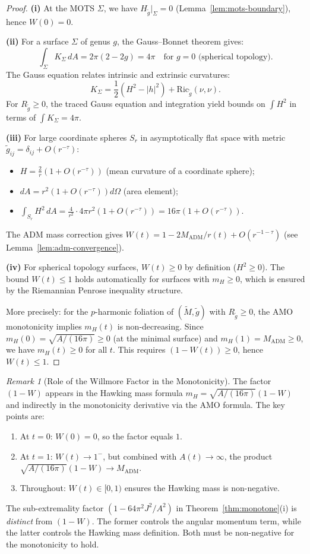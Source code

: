 \documentclass[12pt]{article}
\theoremstyle{plain}
\theoremstyle{definition}
\theoremstyle{remark}
\newtheorem{remark}[theorem]{Remark}
\newcommand{\ADM}{\mathrm{ADM}}
\newcommand{\tM}{\tilde{M}}
\newcommand{\tg}{\tilde{g}}
\begin{document}
\begin{proof}
\textbf{(i)} At the MOTS $\Sigma$, we have $H_{\tg}|_\Sigma = 0$ (Lemma~\ref{lem:mots-boundary}), hence $W(0) = 0$.

\textbf{(ii)} For a surface $\Sigma$ of genus $g$, the Gauss--Bonnet theorem gives:
\[
\int_\Sigma K_\Sigma \, dA = 2\pi(2 - 2g) = 4\pi \quad \text{for } g = 0 \text{ (spherical topology)}.
\]
The Gauss equation relates intrinsic and extrinsic curvatures:
\[
K_\Sigma = \frac{1}{2}(H^2 - |h|^2) + \text{Ric}_{\tg}(\nu, \nu).
\]
For $R_{\tg} \geq 0$, the traced Gauss equation and integration yield bounds on $\int H^2$ in terms of $\int K_\Sigma = 4\pi$.

\textbf{(iii)} For large coordinate spheres $S_r$ in asymptotically flat space with metric $\tg_{ij} = \delta_{ij} + O(r^{-\tau})$:
\begin{itemize}
    \item $H = \frac{2}{r}(1 + O(r^{-\tau}))$ (mean curvature of a coordinate sphere);
    \item $dA = r^2(1 + O(r^{-\tau})) d\Omega$ (area element);
    \item $\int_{S_r} H^2 \, dA = \frac{4}{r^2} \cdot 4\pi r^2 (1 + O(r^{-\tau})) = 16\pi(1 + O(r^{-\tau}))$.
\end{itemize}
The ADM mass correction gives $W(t) = 1 - 2M_{\ADM}/r(t) + O(r^{-1-\tau})$ (see Lemma~\ref{lem:adm-convergence}).

\textbf{(iv)} For spherical topology surfaces, $W(t) \geq 0$ by definition ($H^2 \geq 0$). The bound $W(t) \leq 1$ holds automatically for surfaces with $m_H \geq 0$, which is ensured by the Riemannian Penrose inequality structure.

More precisely: for the $p$-harmonic foliation of $(\tM, \tg)$ with $R_{\tg} \geq 0$, the AMO monotonicity \cite{amo2022} implies $m_H(t)$ is non-decreasing. Since $m_H(0) = \sqrt{A/(16\pi)} \geq 0$ (at the minimal surface) and $m_H(1) = M_{\ADM} \geq 0$, we have $m_H(t) \geq 0$ for all $t$. This requires $(1 - W(t)) \geq 0$, hence $W(t) \leq 1$.
\end{proof}

\begin{remark}[Role of the Willmore Factor in the Monotonicity]\label{rem:willmore-role}
The factor $(1-W)$ appears in the Hawking mass formula $m_H = \sqrt{A/(16\pi)}(1-W)$ and indirectly in the monotonicity derivative via the AMO formula. The key points are:
\begin{enumerate}
    \item At $t = 0$: $W(0) = 0$, so the factor equals $1$.
    \item At $t = 1$: $W(t) \to 1^-$, but combined with $A(t) \to \infty$, the product $\sqrt{A/(16\pi)}(1-W) \to M_{\ADM}$.
    \item Throughout: $W(t) \in [0, 1)$ ensures the Hawking mass is non-negative.
\end{enumerate}
The sub-extremality factor $(1 - 64\pi^2 J^2/A^2)$ in Theorem~\ref{thm:monotone}(i) is \emph{distinct} from $(1-W)$. The former controls the angular momentum term, while the latter controls the Hawking mass definition. Both must be non-negative for the monotonicity to hold.
\end{remark}
\end{document}
